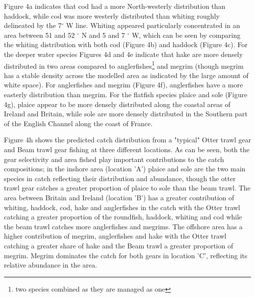 \documentclass{nature}
\begin{document}
\begin{linenumbers}
Figure 4a indicates that cod had a more North-westerly distribution than
haddock, while cod was more westerly distributed than whiting roughly
delineated by the 7$^{\circ}$ W line. Whiting appeared particularly
concentrated in an area between 51 and 52 $^{\circ}$ N and 5 and 7 $^{\circ}$
W, which can be seen by comparing the whiting distribution with both cod
(Figure 4b) and haddock (Figure 4c). For the deeper water species Figures 4d
and 4e indicate that hake are more densely distributed in two areas compared to
anglerfishes\footnote{two species combined as they are managed as one} and
megrim (though megrim has a stable density across the modelled area as
indicated by the large amount of white space). For anglerfishes and megrim
(Figure 4f), anglerfishes have a more easterly distribution than megrim. For
the flatfish species plaice and sole (Figure 4g), plaice appear to be more
densely distributed along the coastal areas of Ireland and Britain, while sole
are more densely distributed in the Southern part of the English Channel along
the coast of France.

Figure 4h shows the predicted catch distribution from a "typical" Otter trawl
gear and Beam trawl gear fishing at three different locations. As can be seen,
both the gear selectivity and area fished play important contributions to the
catch compositions; in the inshore area (location 'A') plaice and sole are the
two main species in catch reflecting their distribution and abundance, though
the otter trawl gear catches a greater proportion of plaice to sole than the
beam trawl.  The area between Britain and Ireland (location 'B') has a greater
contribution of whiting, haddock, cod, hake and anglerfishes in the catch with
the Otter trawl catching a greater proportion of the roundfish, haddock,
whiting and cod while the beam trawl catches more anglerfishes and megrims. The
offshore area has a higher contribution of megrim, anglerfishes and hake with
the Otter trawl catching a greater share of hake and the Beam trawl a greater
proportion of megrim. Megrim dominates the catch for both gears in location
'C', reflecting its relative abundance in the area.  


\end{linenumbers}
\end{document}
